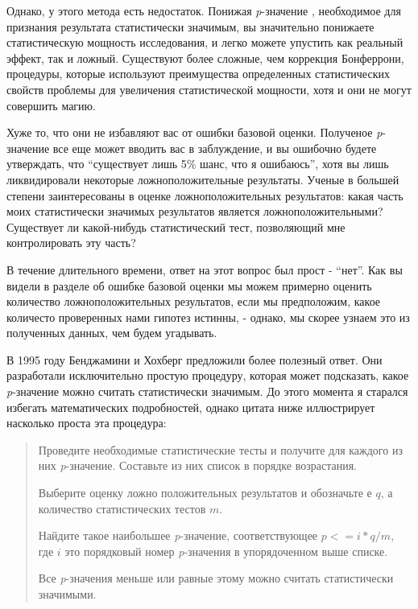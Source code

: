 Однако, у этого метода есть недостаток. Понижая \emph{p}-значение , необходимое для признания результата статистически значимым, вы значительно понижаете статистическую мощность исследования, и легко можете упустить как реальный эффект, так и ложный. Существуют более сложные, чем коррекция Бонферрони, процедуры, которые используют преимущества определенных статистических свойств проблемы для увеличения статистической мощности, хотя и они не могут совершить магию. 

Хуже то, что они не избавляют вас от ошибки базовой оценки. Полученое \emph{p}-значение все еще может вводить вас в заблуждение, и вы ошибочно будете утверждать, что ``существует лишь 5\% шанс, что я ошибаюсь'', хотя вы лишь ликвидировали некоторые ложноположительные результаты. Ученые в большей степени заинтересованы в оценке ложноположительных результатов: какая часть моих статистически значимых результатов является ложноположительными? Существует ли какой-нибудь статистический тест, позволяющий мне контролировать эту часть? 

В течение длительного времени, ответ на этот вопрос был прост - ``нет''. Как вы видели в разделе об ошибке базовой оценки мы можем примерно оценить количество ложноположительных результатов, если мы предположим, какое количесто проверенных нами гипотез истинны, - однако, мы скорее узнаем это из полученных данных, чем будем угадывать. 

В 1995 году Бенджамини и Хохберг предложили более полезный ответ. Они разработали исключительно простую процедуру, которая может подсказать, какое \emph{p}-значение можно считать статистически значимым. До этого момента я старался избегать математических подробностей, однако цитата ниже иллюстрирует насколько проста эта процедура:

\begin{quotation}
Проведите необходимые статистические тесты и получите для каждого из них \emph{p}-значение. Составьте из них список в порядке возрастания.

Выберите оценку ложно положительных результатов и обозначьте е $q$, а количество статистических тестов $m$.

Найдите такое наибольшее \emph{p}-значение, соответствующее $p <= i*q/m$, где $i$ это порядковый номер \emph{p}-значения в упорядоченном выше списке.

Все \emph{p}-значения меньше или равные этому можно считать статистически значимыми. 
\end{quotation}  

